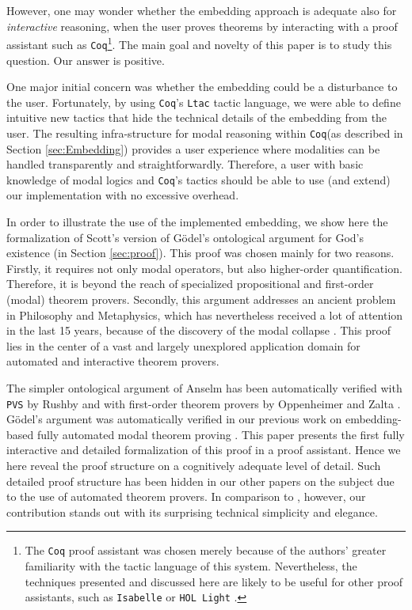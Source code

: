 \documentclass{llncs}
\newcommand{\Coq}{\texttt{Coq}\xspace}
\begin{document}
However, one may wonder whether the embedding approach is adequate
also for \emph{interactive} reasoning, when the user proves theorems
by interacting with a proof assistant such as \Coq\footnote{The \Coq
proof assistant was chosen merely because of the authors' greater
familiarity with the tactic language of this system. Nevertheless, the
techniques presented and discussed here are likely to be useful for
other proof assistants, such as \texttt{Isabelle} \cite{Isabelle} or
\texttt{HOL Light} \cite{HOLLight}.}. The main goal and novelty
of this paper is to study this question. Our answer is positive.

One major initial concern was whether the embedding could be a
disturbance to the user. Fortunately, by using \Coq's \texttt{Ltac}
tactic language, we were able to define intuitive new tactics that
hide the technical details of the embedding from the user. The
resulting infra-structure for modal reasoning within \Coq (as
described in Section \ref{sec:Embedding}) provides a user experience where
modalities can be handled transparently and straightforwardly.
Therefore, a user with basic knowledge of modal logics and \Coq's
tactics should be able to use (and extend) our implementation with no
excessive overhead.

In order to illustrate the use of the implemented embedding, we show
here the formalization of Scott's version \cite{ScottNotes} of G\"odel's
ontological argument for God's existence (in Section \ref{sec:proof}).
This proof was chosen mainly for two reasons. Firstly, it requires not
only modal operators, but also higher-order quantification. Therefore,
it is beyond the reach of specialized propositional and first-order
(modal) theorem provers. Secondly, this argument addresses an ancient
problem in Philosophy and Metaphysics, which has nevertheless received
a lot of attention in the last 15 years, because of the discovery of
the modal collapse \cite{Sobel}. This proof lies in the center of a
vast and largely unexplored application domain for automated and
interactive theorem provers.

The simpler ontological argument of Anselm has been automatically
verified with \texttt{PVS} by Rushby \cite{Rushby} and with 
first-order theorem provers by Oppenheimer and Zalta \cite{Zalta}. Gödel's
argument was automatically verified in our previous work on embedding-
based fully automated modal theorem proving \cite{arXiv,AFP}. This
paper presents the first fully interactive and detailed formalization
of this proof in a proof assistant. Hence we here reveal the proof
structure on a cognitively adequate level of
detail. Such detailed proof structure has been hidden in our
other papers on the subject due to the use of automated theorem
provers. In comparison to \cite{Rushby,Zalta}, however, our
contribution stands out with its surprising technical 
simplicity and elegance. 
\end{document}
